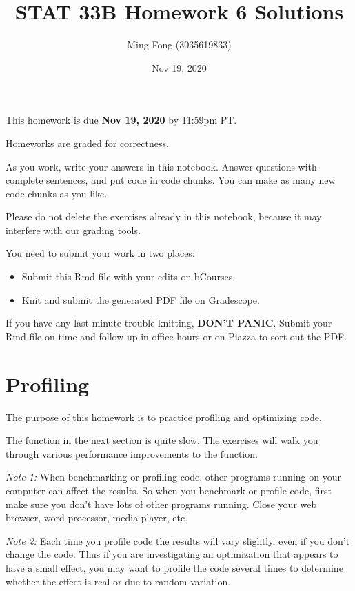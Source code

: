 \documentclass[
]{article}
\title{STAT 33B Homework 6 Solutions}
\author{Ming Fong (3035619833)}
\date{Nov 19, 2020}
\providecommand{\tightlist}{%
  \setlength{\itemsep}{0pt}\setlength{\parskip}{0pt}}
\begin{document}
\maketitle

This homework is due \textbf{Nov 19, 2020} by 11:59pm PT.

Homeworks are graded for correctness.

As you work, write your answers in this notebook. Answer questions with
complete sentences, and put code in code chunks. You can make as many
new code chunks as you like.

Please do not delete the exercises already in this notebook, because it
may interfere with our grading tools.

You need to submit your work in two places:

\begin{itemize}
\tightlist
\item
  Submit this Rmd file with your edits on bCourses.
\item
  Knit and submit the generated PDF file on Gradescope.
\end{itemize}

If you have any last-minute trouble knitting, \textbf{DON'T PANIC}.
Submit your Rmd file on time and follow up in office hours or on Piazza
to sort out the PDF.

\hypertarget{profiling}{%
\section{Profiling}\label{profiling}}

The purpose of this homework is to practice profiling and optimizing
code.

The function in the next section is quite slow. The exercises will walk
you through various performance improvements to the function.

\emph{Note 1:} When benchmarking or profiling code, other programs
running on your computer can affect the results. So when you benchmark
or profile code, first make sure you don't have lots of other programs
running. Close your web browser, word processor, media player, etc.

\emph{Note 2:} Each time you profile code the results will vary
slightly, even if you don't change the code. Thus if you are
investigating an optimization that appears to have a small effect, you
may want to profile the code several times to determine whether the
effect is real or due to random variation.
\end{document}

